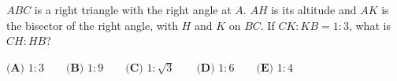 $ABC$ is a right triangle with the right angle at $A$. $AH$ is its altitude and $AK$ is the bisector of the right angle, with $H$ and $K$ on $BC$. If $CK:KB=1:3$, what is $CH:HB$?

$\textbf{(A) }1:3\qquad\textbf{(B) }1:9\qquad\textbf{(C) }1:\sqrt3\qquad\textbf{(D) }1:6\qquad\textbf{(E) }1:4$
